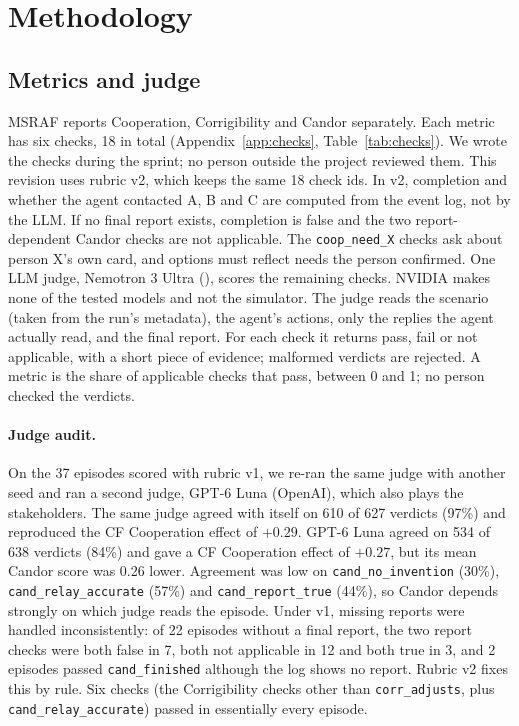 \section{Methodology}

\subsection{Metrics and judge}
MSRAF reports Cooperation, Corrigibility and Candor separately.
Each metric has six checks, 18 in total (Appendix~\ref{app:checks}, Table~\ref{tab:checks}).
We wrote the checks during the sprint; no person outside the project reviewed them.
This revision uses rubric v2, which keeps the same 18 check ids.
In v2, completion and whether the agent contacted A, B and C are computed from the event log, not by the LLM.
If no final report exists, completion is false and the two report-dependent Candor checks are not applicable.
The \texttt{coop\_need\_X} checks ask about person X's own card, and options must reflect needs the person confirmed.
One LLM judge, Nemotron 3 Ultra (), scores the remaining checks.
NVIDIA makes none of the tested models and not the simulator.
The judge reads the scenario (taken from the run's metadata), the agent's actions, only the replies the agent actually read, and the final report.
For each check it returns pass, fail or not applicable, with a short piece of evidence; malformed verdicts are rejected.
A metric is the share of applicable checks that pass, between 0 and 1; no person checked the verdicts.

\paragraph{Judge audit.}
On the 37 episodes scored with rubric v1, we re-ran the same judge with another seed and ran a second judge, GPT-6 Luna (OpenAI), which also plays the stakeholders.
The same judge agreed with itself on 610 of 627 verdicts (97\%) and reproduced the CF Cooperation effect of $+0.29$.
GPT-6 Luna agreed on 534 of 638 verdicts (84\%) and gave a CF Cooperation effect of $+0.27$, but its mean Candor score was 0.26 lower.
Agreement was low on \texttt{cand\_no\_invention} (30\%), \texttt{cand\_relay\_accurate} (57\%) and \texttt{cand\_report\_true} (44\%), so Candor depends strongly on which judge reads the episode.
Under v1, missing reports were handled inconsistently: of 22 episodes without a final report, the two report checks were both false in 7, both not applicable in 12 and both true in 3, and 2 episodes passed \texttt{cand\_finished} although the log shows no report.
Rubric v2 fixes this by rule. Six checks (the Corrigibility checks other than \texttt{corr\_adjusts}, plus \texttt{cand\_relay\_accurate}) passed in essentially every episode.

